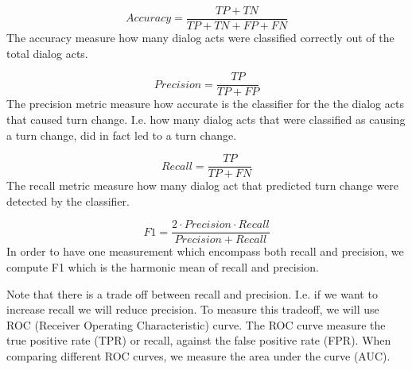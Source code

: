 \begin{equation}
Accuracy = \frac{TP + TN}{TP + TN + FP + FN}
\end{equation}
The accuracy measure how many dialog acts were classified correctly out of the total dialog acts.

\begin{equation}
Precision = \frac{TP }{TP + FP}
\end{equation}
The precision metric measure how accurate is the classifier for the the dialog acts that caused turn change. I.e. how many dialog acts that were classified as causing a turn change, did in fact led to a turn change.

\begin{equation}
Recall = \frac{TP }{TP + FN}
\end{equation}
The recall metric measure how many dialog act that predicted turn change were detected by the classifier.

\begin{equation}
F1 = \frac{2 \cdot Precision\cdot Recall}{Precision+ Recall}
\end{equation}
In order to have one measurement which encompass both recall and precision, we compute F1 which is the
harmonic mean of recall and precision.

Note that there is a trade off between recall and precision. I.e. if we want to increase recall we will reduce precision. To measure this tradeoff, we will use ROC (Receiver Operating Characteristic) curve.
The ROC curve measure the true positive rate (TPR) or recall, against the false positive rate (FPR).
When comparing different ROC curves, we measure the area under the curve (AUC).

